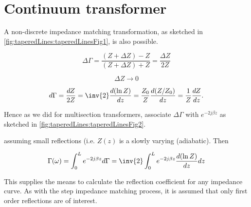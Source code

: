 %
%
\section{Continuum transformer}

A non-discrete impedance matching transformation, as sketched in \cref{fig:taperedLines:taperedLinesFig1}, is also possible.


\begin{equation}\label{eqn:continuumAndOtherTransformersCore:820}
\Delta \Gamma
= \frac{ (Z + \Delta Z) - Z }{(Z + \Delta Z) + Z}
= \frac{\Delta Z}{2 Z}
\end{equation}

\begin{equation}\label{eqn:continuumAndOtherTransformersCore:840}
\Delta Z \rightarrow 0
\end{equation}

\begin{dmath}\label{eqn:continuumAndOtherTransformersCore:860}
d\Gamma
= \frac{dZ}{2 Z}
= \inv{2} \frac{d (\ln Z)}{dz}
= \frac{Z_0}{Z} \frac{d (Z/Z_0)}{dz}
= \frac{1}{Z} \frac{d Z}{dz}.
\end{dmath}

Hence as we did for multisection transformers, associate \( \Delta \Gamma \) with \( e^{- 2j \beta z} \) as sketched in \cref{fig:taperedLines:taperedLinesFig2}.


assuming small reflections (i.e. \( Z(z) \) is a slowly varying (adiabatic).  Then

\begin{dmath}\label{eqn:continuumAndOtherTransformersCore:920}
\Gamma(\omega)
= \int_0^L e^{ -2 j \beta z} d\Gamma
= \inv{2}
\int_0^L e^{ -2 j \beta z}  \frac{d (\ln Z)}{dz} dz
\end{dmath}

This supplies the means to calculate the reflection coefficient for any impedance curve.  As with the step impedance matching process, it is assumed that only first order reflections are of interest.

